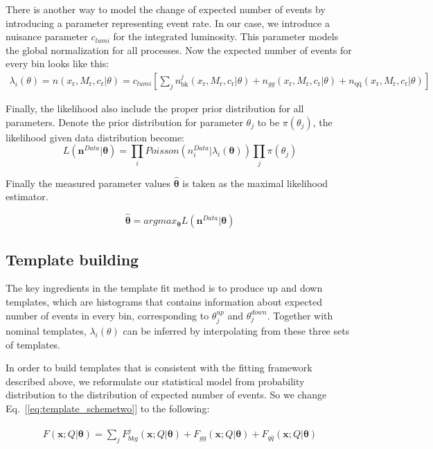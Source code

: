 \documentclass{cmspaperpdf}
\begin{document}
There is another way to model the change of expected number of events by introducing a parameter representing event rate. In our case, we introduce a nuisance parameter $c_{lumi}$ for the integrated luminosity. This parameter models the global normalization for all processes. Now the expected number of events for every bin looks like this:
\begin{align}
\lambda_i(\theta)= n(x_\mathrm{r},M_\mathrm{r},c_\mathrm{r}|\theta) =c_{lumi}\left[\sum_j n^j_\mathrm{bk}(x_\mathrm{r},M_\mathrm{r},c_\mathrm{r}|\theta)+n_{gg}(x_\mathrm{r},M_\mathrm{r},c_\mathrm{r}|\theta) +n_\mathrm{q\bar{q}}(x_\mathrm{r}, M_\mathrm{r}, c_\mathrm{r}|\theta) \right]
\label{eq:theta_exp_evts}
\end{align}

Finally, the likelihood also include the proper prior distribution for all parameters. Denote the prior distribution for parameter $\theta_j$ to be $\pi(\theta_j)$, the likelihood given data distribution become:
\begin{equation}
L(\bm{n}^{Data}|\bm{\theta})=\prod_i Poisson(n_i^{Data}|\lambda_i(\bm{\theta}))\prod_j \pi(\theta_j)
\label{eq:theta_likelihood}
\end{equation}

Finally the measured parameter values $\bm{\hat{\theta}}$ is taken as the maximal likelihood estimator.

\begin{equation}
\bm{\hat{\theta}} = argmax_{\bm{\theta}}L(\bm{n}^{Data}|\bm{\theta})
\end{equation}


\subsection{Template building}
The key ingredients in the template fit method is to produce up and down templates, which are histograms that contains information about expected number of events in every bin, corresponding to $\theta_j^{up}$ and $\theta_j^{down}$. Together with nominal templates, $\lambda_i(\theta)$ can be inferred by interpolating from these three sets of templates. 

In order to build templates that is consistent with the fitting framework described above, we reformulate our statistical model from  probability distribution to the distribution of expected number of events. So we change Eq.~[\ref{eq:template_schemetwo}] to the following:

\begin{align}
F(\bm{x};Q|\bm{\theta}) = \sum_j F_{bkg}^j(\bm{x};Q|\bm{\theta})+F_{gg}(\bm{x};Q|\bm{\theta})+F_{q\bar{q}}(\bm{x};Q|\bm{\theta})
\end{align}
\end{document}
